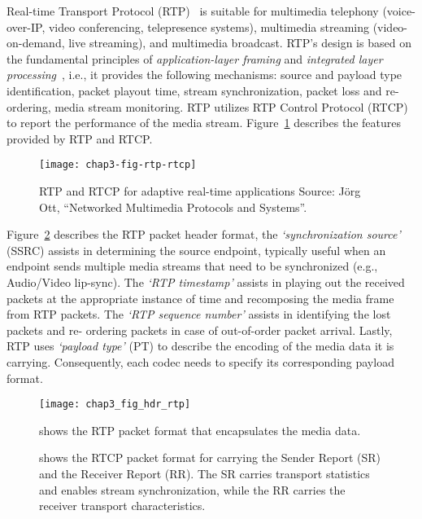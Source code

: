 
Real-time Transport Protocol (RTP)~\cite{rfc3550} is suitable for multimedia
telephony (voice-over-IP, video conferencing, telepresence systems),
multimedia streaming (video-on-demand, live streaming), and multimedia
broadcast. RTP's design is based on the fundamental principles of \textit
{application-layer framing} and \textit{integrated layer
processing}~\cite{clark:alf}, i.e., it provides the following mechanisms:
source and payload type identification, packet playout time, stream
synchronization, packet loss and re-ordering, media stream monitoring. RTP
utilizes RTP Control Protocol (RTCP) to report the performance of the media
stream. Figure~\ref{fig:3:rtp:model} describes the features provided by RTP
and RTCP.

\begin{figure}[!h]
\centerline{
  \texttt{[image: chap3-fig-rtp-rtcp]}
}
\caption{RTP and RTCP for adaptive real-time applications {\scriptsize Source:
J\"org Ott, ``Networked Multimedia Protocols and Systems''}.}
\label{fig:3:rtp:model}
\end{figure}

Figure~\ref{fig:3:rtp.hdr} describes the RTP packet header format, the
\textit{`synchronization source'} (SSRC) assists in determining the source
endpoint, typically useful when an endpoint sends multiple media streams that
need to be synchronized (e.g., Audio/Video lip-sync). The \textit{`RTP
timestamp'} assists in playing out the received packets at the appropriate
instance of time and recomposing the media frame from RTP packets. The
\textit{`RTP sequence number'} assists in identifying the lost packets and re-
ordering packets in case of out-of-order packet arrival. Lastly, RTP uses
\textit{`payload type'} (PT) to describe the encoding of the media data it is
carrying. Consequently, each codec needs to specify its corresponding payload
format.

\begin{figure}[!h]
\centerline{\texttt{[image: chap3\_fig\_hdr\_rtp]}}
\caption{shows the RTP packet format that encapsulates the media data.}
\label{fig:3:rtp.hdr}
\end{figure}

\begin{figure}[!h]
\caption{shows the RTCP packet format for carrying the Sender Report (SR) and
the Receiver Report (RR). The SR carries transport statistics and enables 
stream synchronization, while the RR carries the receiver transport 
characteristics.}
\label{fig:3:rtcp.hdr}
\end{figure}

